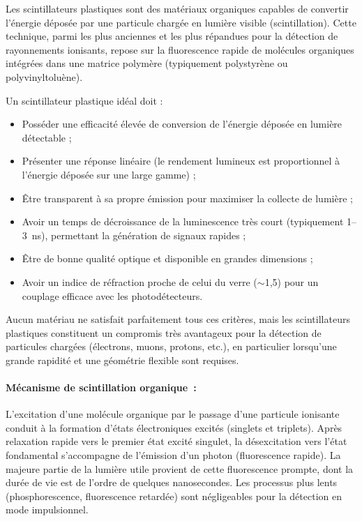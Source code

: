 \documentclass[a4paper,12pt,twoside]{article}
\begin{document}

Les scintillateurs plastiques sont des matériaux organiques capables de convertir l'énergie déposée par une particule chargée en lumière visible (scintillation). Cette technique, parmi les plus anciennes et les plus répandues pour la détection de rayonnements ionisants, repose sur la fluorescence rapide de molécules organiques intégrées dans une matrice polymère (typiquement polystyrène ou polyvinyltoluène).

Un scintillateur plastique idéal doit :
\begin{itemize}
    \item Posséder une efficacité élevée de conversion de l'énergie déposée en lumière détectable ;
    \item Présenter une réponse linéaire (le rendement lumineux est proportionnel à l'énergie déposée sur une large gamme) ;
    \item Être transparent à sa propre émission pour maximiser la collecte de lumière ;
    \item Avoir un temps de décroissance de la luminescence très court (typiquement 1--3~ns), permettant la génération de signaux rapides ;
    \item Être de bonne qualité optique et disponible en grandes dimensions ;
    \item Avoir un indice de réfraction proche de celui du verre ($\sim$1,5) pour un couplage efficace avec les photodétecteurs.
\end{itemize}
Aucun matériau ne satisfait parfaitement tous ces critères, mais les scintillateurs plastiques constituent un compromis très avantageux pour la détection de particules chargées (électrons, muons, protons, etc.), en particulier lorsqu'une grande rapidité et une géométrie flexible sont requises.

\paragraph{Mécanisme de scintillation organique~:} L'excitation d'une molécule organique par le passage d'une particule ionisante conduit à la formation d'états électroniques excités (singlets et triplets). Après relaxation rapide vers le premier état excité singulet, la désexcitation vers l'état fondamental s'accompagne de l'émission d'un photon (fluorescence rapide). La majeure partie de la lumière utile provient de cette fluorescence prompte, dont la durée de vie est de l'ordre de quelques nanosecondes. Les processus plus lents (phosphorescence, fluorescence retardée) sont négligeables pour la détection en mode impulsionnel.
\end{document}
